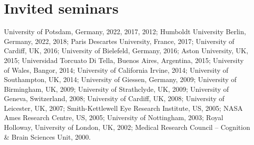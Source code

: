 \documentclass[a4paper, 10pt]{article}
\renewenvironment{itemize}{
  \begin{list}{}{
    \setlength{\leftmargin}{1.5em}
  }
}{
  \end{list}
}
\begin{document}
\section*{Invited seminars}
\begin{itemize}
\item University of Potsdam, Germany, 2022, 2017, 2012; Humboldt University Berlin, Germany, 2022, 2018; Paris Descartes University, France, 2017; University of Cardiff, UK, 2016; University of Bielefeld, Germany, 2016; Aston University, UK, 2015; Universidad Torcuato Di Tella, Buenos Aires, Argentina, 2015; University of Wales, Bangor, 2014; University of California Irvine, 2014; University of Southampton, UK, 2014; University of Giessen, Germany, 2009; University of Birmingham, UK, 2009; University of Strathclyde, UK, 2009; University of Geneva, Switzerland, 2008; University of Cardiff, UK, 2008; University of Leicester, UK, 2007; Smith-Kettlewell Eye Research Institute, US, 2005; NASA Ames Research Centre, US, 2005; University of Nottingham, 2003; Royal Holloway, University of London, UK, 2002; Medical Research Council -- Cognition \& Brain Sciences Unit, 2000.
\end{itemize}
\end{document}
